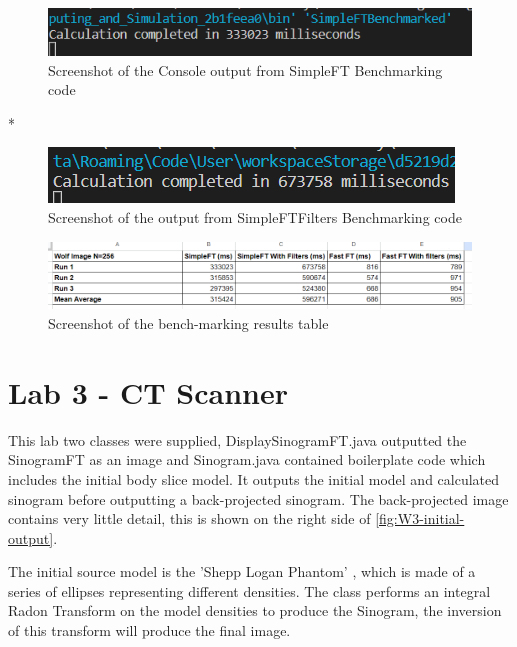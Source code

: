     \begin{figure}[H] 
        \centering
        \includegraphics[width=0.8\columnwidth]{Figures/Week 2/SimpleFT Bench.png}
        \caption{Screenshot of the Console output from SimpleFT Benchmarking code}
        \label{fig:SimpleFT-Bench}
    \end{figure}
*
    \begin{figure}[H] 
        \centering
        \includegraphics[width=0.8\columnwidth]{Figures/Week 2/SimpleFTFilters Bench.png}
        \caption{Screenshot of the output from SimpleFTFilters Benchmarking code}
        \label{fig:SimpleFTFilters-Bench}
    \end{figure}


    \begin{figure}[H] 
        \centering
        \includegraphics[width=1\columnwidth]{Figures/Week 2/Benchmarking results.png}
        \caption{Screenshot of the bench-marking results table}
        \label{fig:bench-results-table}
    \end{figure}
        

\section{Lab 3 - CT Scanner}

This lab two classes were supplied, DisplaySinogramFT.java outputted the SinogramFT as an image and Sinogram.java contained boilerplate code which includes the initial body slice model. It outputs the initial model and calculated sinogram before outputting a back-projected sinogram. The back-projected image contains very little detail, this is shown on the right side of \autoref{fig:W3-initial-output}.

The initial source model is the 'Shepp Logan Phantom' \textcite{6499235}, which is made of a series of ellipses representing different densities. The class performs an integral Radon Transform on the model densities to produce the Sinogram, the inversion of this transform will produce the final image. 


